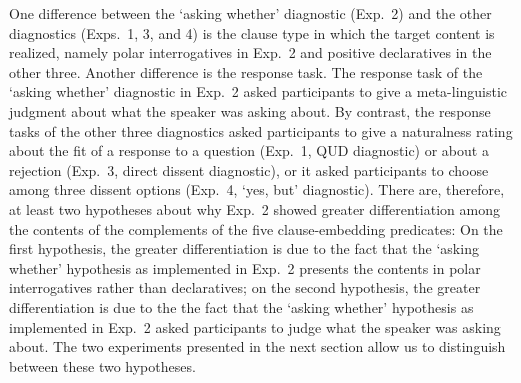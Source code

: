 \documentclass[times,linguex]{glossa}
\begin{document}
One difference between the `asking whether' diagnostic (Exp.~2) and the other diagnostics (Exps.~1, 3, and 4) is the clause type in which the target content is realized, namely polar interrogatives in Exp.~2 and positive declaratives in the other three. Another difference is the response task. The response task of the `asking whether' diagnostic in Exp.~2 asked participants to give a meta-linguistic judgment about what the speaker was asking about. By contrast, the response tasks of the other three diagnostics asked participants to give a naturalness rating about the fit of a response to a question (Exp.~1, QUD diagnostic) or about a rejection (Exp.~3, direct dissent diagnostic), or it asked participants to choose among three  dissent options (Exp.~4, `yes, but' diagnostic). There are, therefore, at least two hypotheses about why Exp.~2 showed greater differentiation among the contents of the complements of the five clause-embedding predicates: On the first hypothesis, the greater differentiation is due to the fact that the `asking whether' hypothesis as implemented in Exp.~2 presents the contents in polar interrogatives rather than declaratives; on the second hypothesis, the greater differentiation is due to the the fact that the `asking whether' hypothesis as implemented in Exp.~2 asked participants to judge what the speaker was asking about. The two experiments presented in the next section allow us to distinguish between these two hypotheses. 
\end{document}

